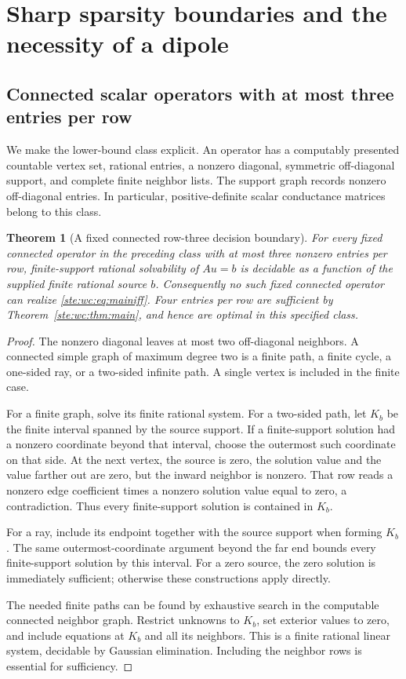 \documentclass[11pt,letterpaper]{article}
\newtheorem{theorem}{Theorem}[section]
\theoremstyle{definition}
\theoremstyle{remark}
\begin{document}
\section{Sharp sparsity boundaries and the necessity of a dipole}
\label{ste:wc:sec:sparsity}

\subsection{Connected scalar operators with at most three entries per row}
We make the lower-bound class explicit. An operator has a computably
presented countable vertex set, rational entries, a nonzero diagonal,
symmetric off-diagonal support, and complete finite neighbor lists. The
support graph records nonzero off-diagonal entries. In particular,
positive-definite scalar conductance matrices belong to this class.

\begin{theorem}[A fixed connected row-three decision boundary]
\label{ste:wc:thm:row3}
For every fixed connected operator in the preceding class with at most
three nonzero entries per row, finite-support rational solvability of
$Au=b$ is decidable as a function of the supplied finite rational source
$b$. Consequently no such fixed connected operator can realize
\eqref{ste:wc:eq:mainiff}. Four entries per row are sufficient by
Theorem~\ref{ste:wc:thm:main}, and hence are optimal in this specified class.
\end{theorem}
\begin{proof}
The nonzero diagonal leaves at most two off-diagonal neighbors. A connected
simple graph of maximum degree two is a finite path, a finite cycle, a
one-sided ray, or a two-sided infinite path. A single vertex is included
in the finite case.

For a finite graph, solve its finite rational system. For a two-sided path,
let $K_b$ be the finite interval spanned by the source support. If a
finite-support solution had a nonzero coordinate beyond that interval,
choose the outermost such coordinate on that side. At the next vertex,
the source is zero, the solution value and the value farther out are zero,
but the inward neighbor is nonzero. That row reads a nonzero edge
coefficient times a nonzero solution value equal to zero, a contradiction.
Thus every finite-support solution is contained in $K_b$.

For a ray, include its endpoint together with the source support when
forming $K_b$. The same outermost-coordinate argument beyond the far end
bounds every finite-support solution by this interval. For a zero source,
the zero solution is immediately sufficient; otherwise these constructions
apply directly.

The needed finite paths can be found by exhaustive search in the
computable connected neighbor graph. Restrict unknowns to $K_b$, set
exterior values to zero, and include equations at $K_b$ and all its
neighbors. This is a finite rational linear system, decidable by Gaussian
elimination. Including the neighbor rows is essential for sufficiency.
\end{proof}
\end{document}
